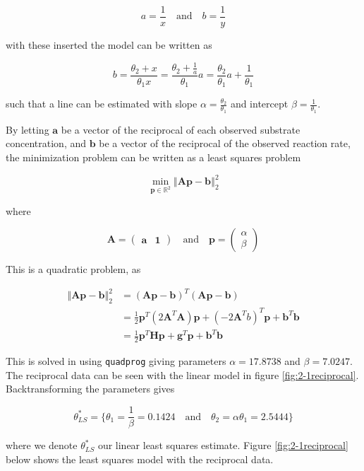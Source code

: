 \[
a = \frac{1}{x} \quad \text{and} \quad b = \frac{1}{y}
\]

with these inserted the model can be written as

\[
b = \frac{\theta_2 + x}{\theta_1 x} = \frac{\theta_2 + \frac{1}{a}}{\theta_1} a = \frac{\theta_2}{\theta_1} a + \frac{1}{\theta_1}
\]

such that a line can be estimated with slope $\alpha = \frac{\theta_2}{\theta_1}$ and intercept $\beta = \frac{1}{\theta_1}$.

By letting $\mathbf{a}$ be a vector of the reciprocal of each observed substrate concentration, and $\mathbf{b}$ be a vector of the reciprocal of the observed reaction rate, the minimization problem can be written as a least squares problem

\[
\min_{\mathbf{p} \in \mathbb{R}^2} \left\Vert \mathbf{A} \mathbf{p} - \mathbf{b} \right\Vert_2^2
\]

where

\[
\mathbf{A} = \begin{pmatrix}
\mathbf{a} & \mathbf{1}
\end{pmatrix} \quad \text{and} \quad
\mathbf{p} = \begin{pmatrix}
\alpha \\ \beta
\end{pmatrix}
\]

This is a quadratic problem, as

\begin{align}
\left\Vert \mathbf{A} \mathbf{p} - \mathbf{b} \right\Vert_ 2^2 &= (\mathbf{A} \mathbf{p} - \mathbf{b})^T (\mathbf{A} \mathbf{p} - \mathbf{b}) \\
&= \frac{1}{2} \mathbf{p}^T (2 \mathbf{A}^T \mathbf{A}) \mathbf{p} + (-2\mathbf{A}^T b)^T \mathbf{p} + \mathbf{b}^T \textbf{b} \\
&= \frac{1}{2} \mathbf{p}^T \mathbf{H} \mathbf{p} + \mathbf{g}^T \mathbf{p} + \mathbf{b}^T \textbf{b}
\end{align}

This is solved in \matlab using \texttt{quadprog} giving parameters $\alpha = 17.8738$ and $\beta = 7.0247$. The reciprocal data can be seen with the linear model in figure \ref{fig:2-1reciprocal}. Backtransforming the parameters gives

\[\theta^{*}_{LS} = \lbrace
\theta_1 = \frac{1}{\beta} = 0.1424\quad \text{and}  \quad
\theta_2 = \alpha \theta_1 = 2.5444\rbrace
\]

where we denote $\theta^{*}_{LS}$ our linear least squares estimate. Figure \ref{fig:2-1reciprocal} below shows the least squares model with the reciprocal data. 


